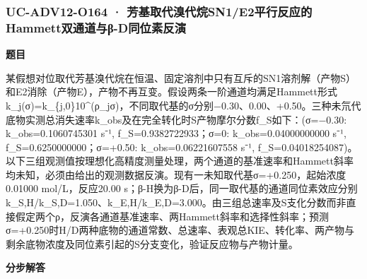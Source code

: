 \documentclass[UTF8,11pt,a4paper]{ctexart}
\begin{document}
\subsubsection*{UC-ADV12-O164 · 芳基取代溴代烷SN1/E2平行反应的Hammett双通道与β-D同位素反演}
\noindent\textbf{题目}\par
某假想对位取代芳基溴代烷在恒温、固定溶剂中只有互斥的SN1溶剂解（产物S）和E2消除（产物E），产物不再互变。假设两条一阶通道均满足Hammett形式k\_j(σ)=k\_\{j,0\}10\textasciicircum{}(ρ\_jσ)，不同取代基的σ分别−0.30、0.00、+0.50。三种未氘代底物实测总消失速率k\_obs及在完全转化时S产物摩尔分数f\_S如下：(σ=−0.30: k\_obs=0.1060745301 s⁻¹, f\_S=0.9382722933；σ=0: k\_obs=0.04000000000 s⁻¹, f\_S=0.6250000000；σ=+0.50: k\_obs=0.06221607558 s⁻¹, f\_S=0.04018254087)。以下三组观测值按理想化高精度测量处理，两个通道的基准速率和Hammett斜率均未知，必须由给出的观测数据反演。现有一未知取代基σ=+0.250，起始浓度0.01000 mol/L，反应20.00 s；β-H换为β-D后，同一取代基的通道同位素效应分别k\_S,H/k\_S,D=1.050、k\_E,H/k\_E,D=3.000。由三组总速率及S支化分数而非直接假定两个ρ，反演各通道基准速率、两Hammett斜率和选择性斜率；预测σ=+0.250时H/D两种底物的通道常数、总速率、表观总KIE、转化率、两产物与剩余底物浓度及同位素引起的S分支变化，验证反应物与产物计量。\par
\medskip\noindent\textbf{分步解答}
\end{document}
